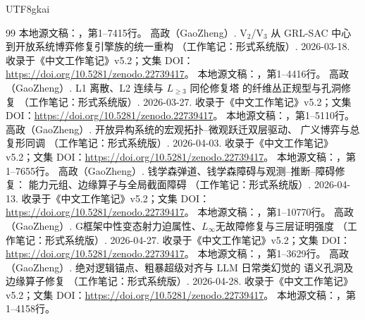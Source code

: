 \documentclass[11pt,a4paper]{article}
\theoremstyle{plain}
\theoremstyle{definition}
\theoremstyle{remark}
\begin{document}
\begin{CJK*}{UTF8}{gkai}
\begin{thebibliography}{99}
\newblock 本地源文稿：，第1--7415行。
高政（GaoZheng）. V\(_2\)/V\(_3\) 从 GRL-SAC 中心到开放系统博弈修复引擎族的统一重构 （工作笔记：形式系统版）. 2026-03-18.
\newblock 收录于《中文工作笔记》v5.2；文集 DOI：\url{https://doi.org/10.5281/zenodo.22739417}。
\newblock 本地源文稿：，第1--4416行。
高政（GaoZheng）. L1 离散、L2 连续与 $L_{\ge 3}$ 同伦修复塔 的纤维丛正规型与孔洞修复 （工作笔记：形式系统版）. 2026-03-27.
\newblock 收录于《中文工作笔记》v5.2；文集 DOI：\url{https://doi.org/10.5281/zenodo.22739417}。
\newblock 本地源文稿：，第1--5110行。
高政（GaoZheng）. 开放异构系统的宏观拓扑--微观跃迁双层驱动、 广义博弈与总复形同调 （工作笔记：形式系统版）. 2026-04-03.
\newblock 收录于《中文工作笔记》v5.2；文集 DOI：\url{https://doi.org/10.5281/zenodo.22739417}。
\newblock 本地源文稿：，第1--7655行。
高政（GaoZheng）. 钱学森弹道、钱学森障碍与观测--推断--障碍修复： 能力元组、边缘算子与全局截面障碍 （工作笔记：形式系统版）. 2026-04-13.
\newblock 收录于《中文工作笔记》v5.2；文集 DOI：\url{https://doi.org/10.5281/zenodo.22739417}。
\newblock 本地源文稿：，第1--10770行。
高政（GaoZheng）. G框架中性变态射力迫属性、\texorpdfstring{$L_\infty$}{L-infinity}无故障修复与三层证明强度 （工作笔记：形式系统版）. 2026-04-27.
\newblock 收录于《中文工作笔记》v5.2；文集 DOI：\url{https://doi.org/10.5281/zenodo.22739417}。
\newblock 本地源文稿：，第1--3629行。
高政（GaoZheng）. 绝对逻辑锚点、粗暴超级对齐与 LLM 日常类幻觉的 语义孔洞及边缘算子修复 （工作笔记：形式系统版）. 2026-04-28.
\newblock 收录于《中文工作笔记》v5.2；文集 DOI：\url{https://doi.org/10.5281/zenodo.22739417}。
\newblock 本地源文稿：，第1--4158行。

\end{thebibliography}
\end{CJK*}
\end{document}
